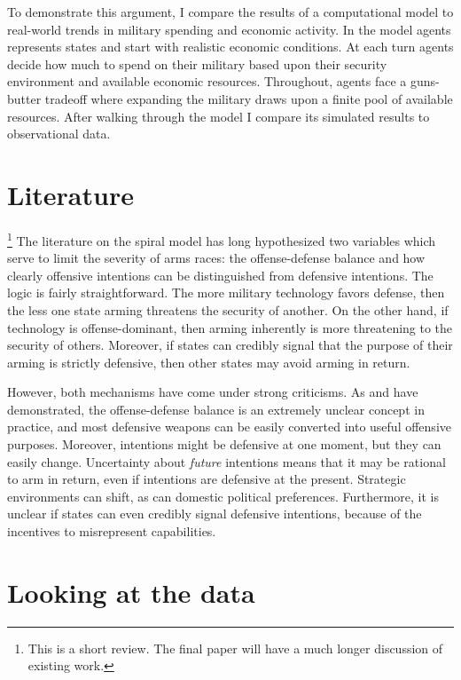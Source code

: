 \documentclass[12pt]{article}
\begin{document}
To demonstrate this argument, I compare the results of a computational model to real-world trends in military spending and economic activity. In the model agents represents states and start with realistic economic conditions. At each turn agents decide how much to spend on their military based upon their security environment and available economic resources. Throughout, agents face a guns-butter tradeoff where expanding the military draws upon a finite pool of available resources. After walking through the model I compare its simulated results to observational data.


\section{Literature}\footnote{This is a short review. The final paper will have a much longer discussion of existing work.}
The literature on the spiral model has long hypothesized two variables which serve to limit the severity of arms races: the offense-defense balance and how clearly offensive intentions can be distinguished from defensive intentions. The logic is fairly straightforward. The more military technology favors defense, then the less one state arming threatens the security of another. On the other hand, if technology is offense-dominant, then arming inherently is more threatening to the security of others. Moreover, if states can credibly signal that the purpose of their arming is strictly defensive, then other states may avoid arming in return.

However, both mechanisms have come under strong criticisms. As \citet{biddle2001} and \citet{glaser1998} have demonstrated, the offense-defense balance is an extremely unclear concept in practice, and most defensive weapons can be easily converted into useful offensive purposes. Moreover, intentions might be defensive at one moment, but they can easily change. \citep{copeland2000} Uncertainty about \textit{future} intentions means that it may be rational to arm in return, even if intentions are defensive at the present. Strategic environments can shift, as can domestic political preferences. Furthermore, it is unclear if states can even credibly signal defensive intentions, because of the incentives to misrepresent capabilities. \citep{fearon1995}

\section{Looking at the data}
\end{document}
